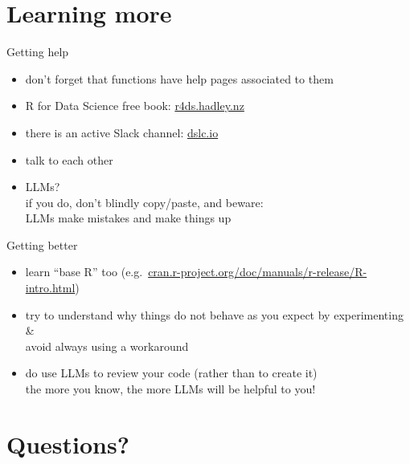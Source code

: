 \documentclass[
  ignorenonframetext,
  aspectratio=169,
]{beamer}
\providecommand{\tightlist}{%
  \setlength{\itemsep}{0pt}\setlength{\parskip}{0pt}}
\begin{document}
\section{Learning more}\label{learning-more}

\begin{frame}{Getting help}
\protect{}\label{getting-help}
\begin{itemize}
\tightlist
\item
  don't forget that functions have help pages associated to them
\item
  R for Data Science free book:
  \href{https://r4ds.hadley.nz}{r4ds.hadley.nz}
\item
  there is an active Slack channel: \href{https://dslc.io}{dslc.io}
\item
  talk to each other
\item
  LLMs?\\
  if you do, don't blindly copy/paste, and beware:\\
  LLMs make mistakes and make things up
\end{itemize}
\end{frame}

\begin{frame}{Getting better}
\protect{}\label{getting-better}
\begin{itemize}
\tightlist
\item
  learn ``base R'' too
  (e.g.~\href{https://cran.r-project.org/doc/manuals/r-release/R-intro.html}{cran.r-project.org/doc/manuals/r-release/R-intro.html})
\item
  try to understand why things do not behave as you expect by
  experimenting \&\\
  avoid always using a workaround
\item
  do use LLMs to review your code (rather than to create it)\\
  the more you know, the more LLMs will be helpful to you!
\end{itemize}
\end{frame}

\section*{Questions?}\label{questions}
\end{document}
